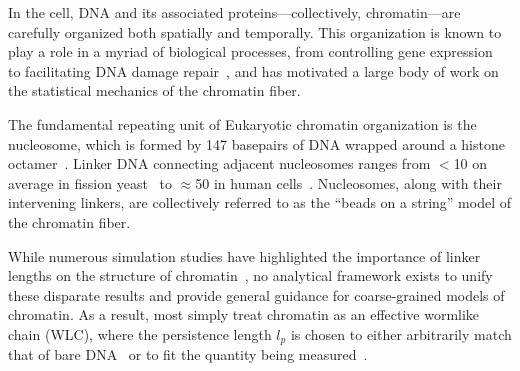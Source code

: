 \documentclass[%
 reprint,
superscriptaddress,
showpacs,preprintnumbers,
 amsmath,amssymb,
 aps,
 prl,
]{revtex4-1}
\begin{document}
\maketitle


In the cell, DNA and its associated proteins---collectively, chromatin---are
    carefully organized both spatially and temporally.
This organization is known to play a role in a myriad of biological processes,
    from controlling gene expression~\cite{hubner2013} to facilitating DNA
    damage repair~\cite{hauer2017,stadler2017}, and has motivated a large body
    of work on the statistical mechanics of the chromatin fiber.

The fundamental repeating unit of Eukaryotic chromatin organization is the
    nucleosome, which is formed by 147 basepairs of DNA wrapped around a histone
    octamer~\cite{cutter2015a}.
Linker DNA connecting adjacent nucleosomes ranges from $<$\SI{10}{\basepair} on
    average in fission yeast~\cite{givens2012} to {$\approx$\SI{50}{\basepair}} in human
    cells~\cite{schones2008}.
Nucleosomes, along with their intervening linkers, are collectively referred to
    as the ``beads on a string'' model of the chromatin fiber.

While numerous simulation studies have highlighted the importance of linker
    lengths on the structure of chromatin~\cite{bascom2017a,
    collepardo-guevara2014, bascom2018, grigoryev2016, kepper2008, koslover2010,
    langowski2007, muller2014, schiessel2001, scipioni2010, wedemann2002,
    woodcock1993%
    }, no analytical framework exists to unify these disparate results and
    provide general guidance for coarse-grained models of chromatin.
As a result, most simply treat chromatin as an effective
    wormlike chain (WLC), where the persistence length $l_p$ is chosen to either
    arbitrarily match that of bare DNA~\cite{benedetti2017, macpherson2018,
    nuebler2018} or to fit the quantity being
    measured~\cite{sanborn2015,pierro2017}.
\end{document}
